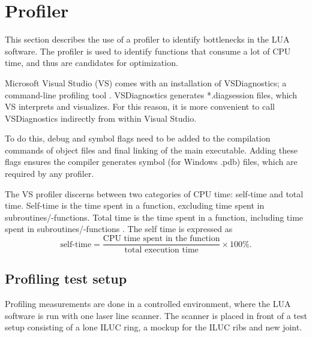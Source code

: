 \section{Profiler} \label{sec:profiler}
This section describes the use of a profiler to identify bottlenecks in the LUA software. The profiler is used to identify functions that consume a lot of CPU time, and thus are candidates for optimization.

Microsoft Visual Studio (VS) comes with an installation of VSDiagnostics; a command-line profiling tool \cite{vsdiagnostics}. VSDiagnostics generates *.diagsession files, which VS interprets and visualizes. For this reason, it is more convenient to call VSDiagnostics indirectly from within Visual Studio.

To do this, debug and symbol flags need to be added to the compilation commands of object files and final linking of the main executable. Adding these flags ensures the compiler generates symbol (for Windows .pdb) files, which are required by any profiler.

The VS profiler discerns between two categories of CPU time: self-time and total time. Self-time is the time spent in a function, excluding time spent in subroutines/-functions. Total time is the time spent in a function, including time spent in subroutines/-functions \cite{cpu_usage}. The self time is expressed as
\begin{equation}
    \text{self-time} = \frac{\text{CPU time spent in the function}}{\text{total execution time}} \times 100\%.
    \label{eq:self_time}
\end{equation}

\subsection{Profiling test setup}
Profiling measurements are done in a controlled environment, where the LUA software is run with one laser line scanner. The scanner is placed in front of a test setup consisting of a lone ILUC ring, a mockup for the ILUC ribs and new joint.

